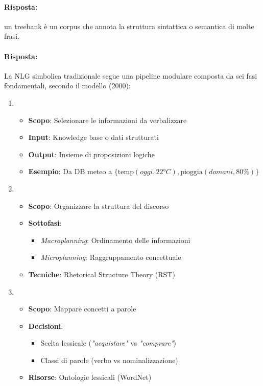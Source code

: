 
\paragraph{Risposta:} un treebank è un corpus che annota la struttura sintattica o semantica di molte frasi.


\paragraph{Risposta:} La NLG simbolica tradizionale segue una pipeline modulare composta da sei fasi fondamentali, secondo il modello  (2000):

\begin{enumerate}
\item {}
\begin{itemize}
    \item \textbf{Scopo}: Selezionare le informazioni da verbalizzare
    \item \textbf{Input}: Knowledge base o dati strutturati
    \item \textbf{Output}: Insieme di proposizioni logiche
    \item \textbf{Esempio}: Da DB meteo a $\{\text{temp}(oggi, 22°C), \text{pioggia}(domani, 80\%)\}$
\end{itemize}

\item {}
\begin{itemize}
    \item \textbf{Scopo}: Organizzare la struttura del discorso
    \item \textbf{Sottofasi}:
    \begin{itemize}
        \item \textit{Macroplanning}: Ordinamento delle informazioni
        \item \textit{Microplanning}: Raggruppamento concettuale
    \end{itemize}
    \item \textbf{Tecniche}: Rhetorical Structure Theory (RST)
\end{itemize}

\item {}
\begin{itemize}
    \item \textbf{Scopo}: Mappare concetti a parole
    \item \textbf{Decisioni}:
    \begin{itemize}
        \item Scelta lessicale (\textit{"acquistare"} vs \textit{"comprare"})
        \item Classi di parole (verbo vs nominalizzazione)
    \end{itemize}
    \item \textbf{Risorse}: Ontologie lessicali (WordNet)
\end{itemize}


\end{enumerate}
